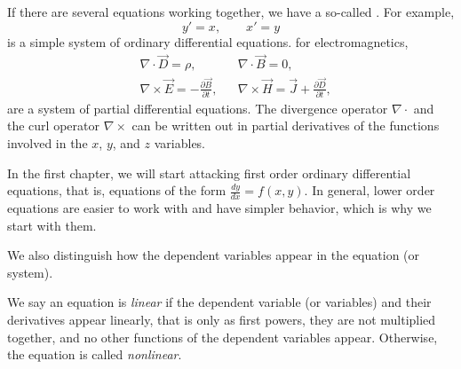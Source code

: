 If there are several equations working together, we have a so-called
\emph{}.  For example,
\begin{equation*}
y' = x , \qquad x' = y
\end{equation*}
is a simple system of ordinary differential equations.
 for electromagnetics,
\begin{align*}
& \nabla \cdot \vec{D} = \rho, & & \nabla \cdot \vec{B} = 0 , \\
& \nabla \times \vec{E} = - \frac{\partial \vec{B}}{\partial t}, &
& \nabla \times \vec{H} = \vec{J} + \frac{\partial \vec{D}}{\partial t} ,
\end{align*}
are a system of partial differential equations. 
The divergence operator $\nabla \cdot$ and the
curl operator $\nabla \times$ can be written out in partial derivatives of
the functions involved in the $x$, $y$, and $z$ variables.

\medskip


In the first chapter, we will start attacking first order ordinary
differential equations, that is, equations of the form $\frac{dy}{dx} = f(x,y)$.
In general, lower order equations are easier to work with and have simpler
behavior, which is why we start with them.

\medskip

We also distinguish how the dependent variables appear in the equation (or
system).  
\begin{definition}
We say an equation is
\emph{linear} if the
dependent variable (or variables) and their derivatives appear linearly,
that is only as first powers, they are not multiplied together, and no other functions of the dependent
variables appear.  
Otherwise, the equation is called
\emph{nonlinear}.
\end{definition}

